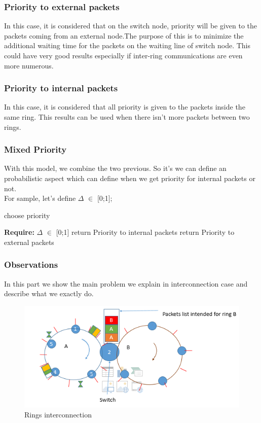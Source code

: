\documentclass{article}
\begin{document}
\subsubsection{Priority to external packets}
In this case, it is considered that  on the switch node, priority will be given to the packets coming from an external node.The purpose of this is to minimize the additional waiting time for the packets on the waiting line of switch node. This could have very good results especially if inter-ring communications are even more numerous.\\

\subsubsection{Priority to internal packets}
In this case, it is considered that all priority is given to the packets inside the same ring. This results can be used when there isn't more packets between two rings. \\

\subsubsection{Mixed Priority}
With this model, we combine the two previous. So it's we can define an probabilistic aspect which can define when we get priority for internal packets or not.\\
 For sample, let's define  \textbf{$\Delta$} $\in$ [0;1]; \\

\begin{algorithm}
\caption{choose priority}
\begin{algorithmic}
\State \textbf{Require:} $\Delta$ $\in$ [0;1]
\State return Priority to internal packets
\Else
\State return Priority to external packets
\EndIf
\end{algorithmic}
\end{algorithm}  


\subsubsection{Observations}
In this part we show the main problem we explain in interconnection case and describe what we exactly do.\\
\begin{figure}[h!]
\begin{center}
\includegraphics[scale=0.8]{inter1.png}
\caption{Rings interconnection}
\end{center}
\end{figure}
\end{document}

